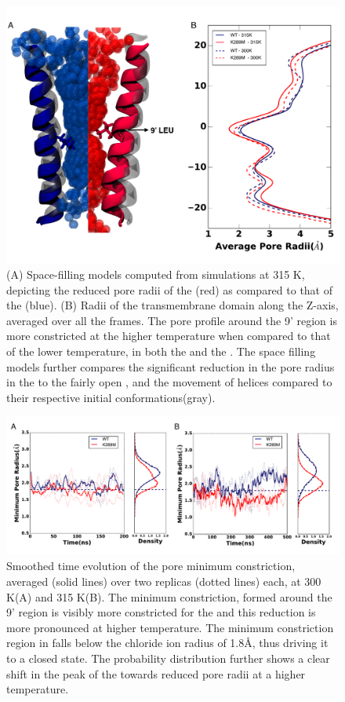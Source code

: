 \documentclass[12pt,onecolumn]{biophys}
\begin{document}
\begin{figure}
\begin{center}
\includegraphics[width = 1\textwidth]{figures/pore_radd_fill.pdf}
\end{center}
\caption{(A) Space-filling models computed from simulations at 315 K, depicting the reduced pore radii of the \MT(red) as compared to that of the \WT(blue). (B) Radii of the transmembrane domain along the Z-axis, averaged over all the frames. The pore profile around the 9' region is more constricted at the higher temperature when compared to that of the lower temperature, in both the \WT and the \MT. The space filling models further compares the significant reduction in the pore radius in the \MT to the fairly open \WT, and the movement of helices compared to their respective initial conformations(gray).}
\label{fig:pore-profile}
\end{figure}

\begin{figure}
\begin{center}
\includegraphics[width = 1\textwidth]{figures/min_pore_radd.pdf}
\end{center}
\caption{Smoothed time evolution of the pore minimum constriction, averaged (solid lines) over two replicas (dotted lines) each, at 300 K(A) and 315 K(B). The minimum constriction, formed around the 9' region is visibly more constricted for the \MTs and this reduction is more pronounced at higher temperature. The minimum constriction region in \MT falls below the chloride ion radius of 1.8\AA, thus driving it to a closed state. The probability distribution further shows a clear shift in the peak of the \MTs towards reduced pore radii at a higher temperature.}
\label{fig:pore-evolution}
\end{figure}
\end{document}
